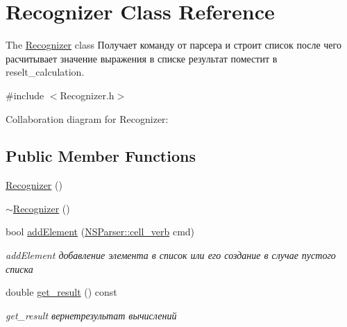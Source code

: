 \hypertarget{classRecognizer}{}\section{Recognizer Class Reference}
\label{classRecognizer}


The \hyperlink{classRecognizer}{Recognizer} class Получает команду от парсера и строит список после чего расчитывает значение выражения в списке результат поместит в reselt\+\_\+calculation.  




{\ttfamily \#include $<$Recognizer.\+h$>$}



Collaboration diagram for Recognizer\+:
\subsection*{Public Member Functions}
\begin{DoxyCompactItemize}
\item 
\hyperlink{classRecognizer_a4bf77b760d8dbc50c4ef50cad433db40}{Recognizer} ()
\item 
\hyperlink{classRecognizer_aa0035e71951a13fe00764a54913d0e5a}{$\sim$\+Recognizer} ()
\item 
bool \hyperlink{classRecognizer_aeadea601dea82f59e0750ed7adbef337}{add\+Element} (\hyperlink{structNSParser_1_1cell__verb}{N\+S\+Parser\+::cell\+\_\+verb} cmd)
\begin{DoxyCompactList}\small\item\em add\+Element добавление элемента в список или его создание в случае пустого списка \end{DoxyCompactList}\item 
double \hyperlink{classRecognizer_a31399be9b5e3eaf37dc90a749ed771bb}{get\+\_\+result} () const 
\begin{DoxyCompactList}\small\item\em get\+\_\+result вернетрезультат вычислений \end{DoxyCompactList}\end{DoxyCompactItemize}
